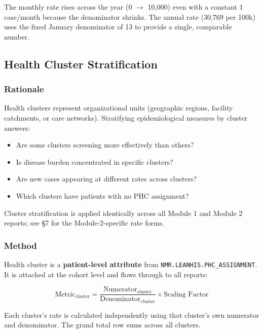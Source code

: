 \documentclass[11pt,a4paper]{article}
\begin{document}
The monthly rate rises across the year (0 $\rightarrow$ 10,000) even with a constant 1 case/month because the denominator shrinks. The annual rate (30,769 per 100k) uses the fixed January denominator of 13 to provide a single, comparable number.

\subsection{Health Cluster Stratification}

\subsubsection{Rationale}
Health clusters represent organizational units (geographic regions, facility catchments, or care networks). Stratifying epidemiological measures by cluster answers:
\begin{itemize}[leftmargin=*]
    \item Are some clusters screening more effectively than others?
    \item Is disease burden concentrated in specific clusters?
    \item Are new cases appearing at different rates across clusters?
    \item Which clusters have patients with no PHC assignment?
\end{itemize}

Cluster stratification is applied identically across all Module 1 and Module 2 reports; see §7 for the Module-2-specific rate forms.

\subsubsection{Method}
Health cluster is a \textbf{patient-level attribute} from \texttt{NMR.LEANHIS.PHC\_ASSIGNMENT}. It is attached at the cohort level and flows through to all reports:

\begin{equation}
\text{Metric}_{\text{cluster}} =
\frac{\text{Numerator}_{\text{cluster}}}
     {\text{Denominator}_{\text{cluster}}} \times \text{Scaling Factor}
\end{equation}

Each cluster's rate is calculated independently using that cluster's own numerator and denominator. The grand total row sums across all clusters.
\end{document}
